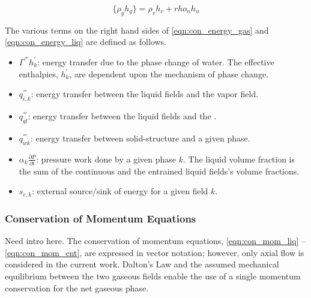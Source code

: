 \begin{equation}
\label{eqn:gaseous_enthalpy}
\{\rho_g h_g\} = \rho_v h_v + rho_n h_n
\end{equation}

The various terms on the right hand sides of \eqref{eqn:con_energy_gas} and \eqref{eqn:con_energy_liq} are defined as follows.
\begin{itemize}
\item{
$\Gamma^{'''} h^{'}_k$:
 energy transfer due to the phase change of water.
 The effective enthalpies, $h^{'}_k$, are dependent upon the mechanism of phase change.
}
\item{
$q^{'''}_{i,k}$:
energy transfer between the liquid fields and the vapor field.
}
\item{
$q^{'''}_{gl}$:
energy transfer between the liquid fields and the \ncgs{}.
}
\item{
$q^{'''}_{wk}$:
 energy transfer between solid-structure and a given phase.
}
\item{
$\alpha_k \frac{\partial P}{\partial t}$:
 pressure work done by a given phase $k$.
 The liquid volume fraction is the sum of the continuous and the entrained liquid fields's volume fractions.
}
\item{
$s_{e,k}$:
 external source/sink of energy for a given field $k$.
}
\end{itemize}

\subsubsection{Conservation of Momentum Equations}
\label{subsubsect:momentum_equations}

Need intro here.
The conservation of momentum equations, \eqref{eqn:con_mom_liq} -- \eqref{eqn:con_mom_ent}, are expressed in vector notation; however, only axial flow is considered in the current work.
Dalton's Law and the assumed mechanical equilibrium between the two gaseous fields enable the use of a single momentum conservation for the net gaseous phase.

